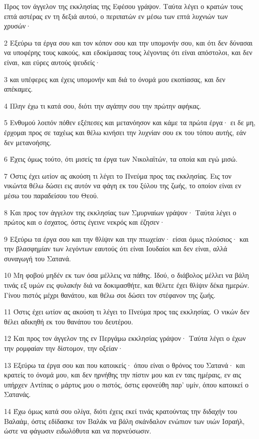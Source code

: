 \par Προς τον άγγελον της εκκλησίας της Εφέσου γράψον. Ταύτα λέγει ο κρατών τους επτά αστέρας εν τη δεξιά αυτού, ο περιπατών εν μέσω των επτά λυχνιών των χρυσών·
\par 2 Εξεύρω τα έργα σου και τον κόπον σου και την υπομονήν σου, και ότι δεν δύνασαι να υποφέρης τους κακούς, και εδοκίμασας τους λέγοντας ότι είναι απόστολοι, και δεν είναι, και εύρες αυτούς ψευδείς·
\par 3 και υπέφερες και έχεις υπομονήν και διά το όνομά μου εκοπίασας, και δεν απέκαμες.
\par 4 Πλην έχω τι κατά σου, διότι την αγάπην σου την πρώτην αφήκας.
\par 5 Ενθυμού λοιπόν πόθεν εξέπεσες και μετανόησον και κάμε τα πρώτα έργα· ει δε μη, έρχομαι προς σε ταχέως και θέλω κινήσει την λυχνίαν σου εκ του τόπου αυτής, εάν δεν μετανοήσης.
\par 6 Έχεις όμως τούτο, ότι μισείς τα έργα των Νικολαϊτών, τα οποία και εγώ μισώ.
\par 7 Όστις έχει ωτίον ας ακούση τι λέγει το Πνεύμα προς τας εκκλησίας. Εις τον νικώντα θέλω δώσει εις αυτόν να φάγη εκ του ξύλου της ζωής, το οποίον είναι εν μέσω του παραδείσου του Θεού.
\par 8 Και προς τον άγγελον της εκκλησίας των Σμυρναίων γράψον· Ταύτα λέγει ο πρώτος και ο έσχατος, όστις έγεινε νεκρός και έζησεν·
\par 9 Εξεύρω τα έργα σου και την θλίψιν και την πτωχείαν· είσαι όμως πλούσιος· και την βλασφημίαν των λεγόντων εαυτούς ότι είναι Ιουδαίοι και δεν είναι, αλλά συναγωγή του Σατανά.
\par 10 Μη φοβού μηδέν εκ των όσα μέλλεις να πάθης. Ιδού, ο διάβολος μέλλει να βάλη τινάς εξ υμών εις φυλακήν διά να δοκιμασθήτε, και θέλετε έχει θλίψιν δέκα ημερών. Γίνου πιστός μέχρι θανάτου, και θέλω σοι δώσει τον στέφανον της ζωής.
\par 11 Όστις έχει ωτίον ας ακούση τι λέγει το Πνεύμα προς τας εκκλησίας. Ο νικών δεν θέλει αδικηθή εκ του θανάτου του δευτέρου.
\par 12 Και προς τον άγγελον της εν Περγάμω εκκλησίας γράψον· Ταύτα λέγει ο έχων την ρομφαίαν την δίστομον, την οξείαν·
\par 13 Εξεύρω τα έργα σου και που κατοικείς· όπου είναι ο θρόνος του Σατανά· και κρατείς το όνομά μου, και δεν ηρνήθης την πίστιν μου και εν ταις ημέραις, εν αις υπήρχεν Αντίπας ο μάρτυς μου ο πιστός, όστις εφονεύθη παρ' υμίν, όπου κατοικεί ο Σατανάς.
\par 14 Έχω όμως κατά σου ολίγα, διότι έχεις εκεί τινάς κρατούντας την διδαχήν του Βαλαάμ, όστις εδίδασκε τον Βαλάκ να βάλη σκάνδαλον ενώπιον των υιών Ισραήλ, ώστε να φάγωσιν ειδωλόθυτα και να πορνεύσωσιν.
